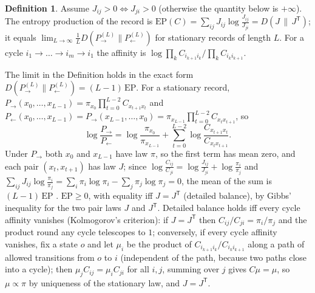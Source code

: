\documentclass[11pt]{article}
\theoremstyle{definition}\newtheorem{definition}[theorem]{Definition}
\theoremstyle{remark}\newtheorem{remark}[theorem]{Remark}
\begin{document}
\begin{definition}\label{def:ep}
Assume $J_{ij}>0\iff J_{ji}>0$ (otherwise the quantity below is $+\infty$). The entropy production of the record is $\mathrm{EP}(C)=\sum_{ij}J_{ij}\log\frac{J_{ij}}{J_{ji}}=D(J\,\|\,J^{\mathsf T})$; it equals $\lim_{L\to\infty}\frac1LD(P_{\to}^{(L)}\|P_{\leftarrow}^{(L)})$ for stationary records of length $L$. For a cycle $i_1\to\dots\to i_m\to i_1$ the affinity is $\log\prod_kC_{i_{k+1}i_k}/\prod_kC_{i_ki_{k+1}}$.
\end{definition}
The limit in the Definition holds in the exact form $D(P_\to^{(L)}\|P_\leftarrow^{(L)})=(L-1)\,\mathrm{EP}$. For a stationary record, $P_\to(x_0,\dots,x_{L-1})=\pi_{x_0}\prod_{t=0}^{L-2}C_{x_{t+1}x_t}$ and $P_\leftarrow(x_0,\dots,x_{L-1})=P_\to(x_{L-1},\dots,x_0)=\pi_{x_{L-1}}\prod_{t=0}^{L-2}C_{x_tx_{t+1}}$, so
\[
\log\frac{P_\to}{P_\leftarrow}=\log\frac{\pi_{x_0}}{\pi_{x_{L-1}}}+\sum_{t=0}^{L-2}\log\frac{C_{x_{t+1}x_t}}{C_{x_tx_{t+1}}}.
\]
Under $P_\to$ both $x_0$ and $x_{L-1}$ have law $\pi$, so the first term has mean zero, and each pair $(x_t,x_{t+1})$ has law $J$; since $\log\frac{C_{ij}}{C_{ji}}=\log\frac{J_{ij}}{J_{ji}}+\log\frac{\pi_i}{\pi_j}$ and $\sum_{ij}J_{ij}\log\frac{\pi_i}{\pi_j}=\sum_i\pi_i\log\pi_i-\sum_j\pi_j\log\pi_j=0$, the mean of the sum is $(L-1)\,\mathrm{EP}$ \cite{Gaspard,GaspardErr}. $\mathrm{EP}\ge0$, with equality iff $J=J^{\mathsf T}$ (detailed balance), by Gibbs' inequality for the two pair laws $J$ and $J^{\mathsf T}$. Detailed balance holds iff every cycle affinity vanishes (Kolmogorov's criterion): if $J=J^{\mathsf T}$ then $C_{ij}/C_{ji}=\pi_i/\pi_j$ and the product round any cycle telescopes to $1$; conversely, if every cycle affinity vanishes, fix a state $o$ and let $\mu_i$ be the product of $C_{i_{k+1}i_k}/C_{i_ki_{k+1}}$ along a path of allowed transitions from $o$ to $i$ (independent of the path, because two paths close into a cycle); then $\mu_jC_{ij}=\mu_iC_{ji}$ for all $i,j$, summing over $j$ gives $C\mu=\mu$, so $\mu\propto\pi$ by uniqueness of the stationary law, and $J=J^{\mathsf T}$.
\end{document}
